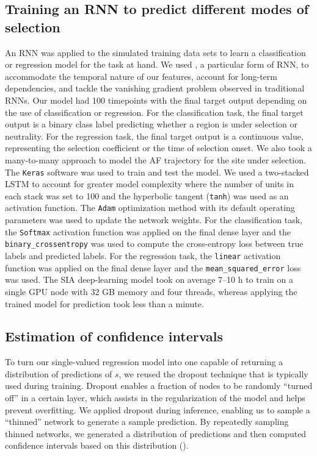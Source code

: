 \subsection{Training an \ac{RNN} to predict different modes of selection}
An \ac{RNN} was applied to the simulated training data sets to learn a classification or regression model for the task at hand. We used , a particular form of \ac{RNN}, to accommodate the temporal nature of our features, account for long-term dependencies, and tackle the vanishing gradient problem observed in traditional \acp{RNN}. Our model had 100 timepoints with the final target output depending on the use of classification or regression. For the classification task, the final target output is a binary class label predicting whether a region is under selection or neutrality. For the regression task, the final target output is a continuous value, representing the selection coefficient or the time of selection onset. We also took a many-to-many approach to model the \ac{AF} trajectory for the site under selection. The \texttt{Keras} software was used to train and test the model. We used a two-stacked \ac{LSTM} to account for greater model complexity where the number of units in each stack was set to 100 and the hyperbolic tangent (\texttt{tanh}) was used as an activation function. The \texttt{Adam} optimization method with its default operating parameters was used to update the network weights. For the classification task, the \texttt{Softmax} activation function was applied on the final dense layer and the \texttt{binary\_crossentropy} was used to compute the cross-entropy loss between true labels and predicted labels. For the regression task, the \texttt{linear} activation function was applied on the final dense layer and the \texttt{mean\_squared\_error} loss was used. The \ac{SIA} deep-learning model took on average 7–10 h to train on a single \acs{GPU} node with 32 GB memory and four threads, whereas applying the trained model for prediction took less than a minute.

\subsection{Estimation of confidence intervals}
To turn our single-valued regression model into one capable of returning a distribution of predictions of $s$, we reused the dropout technique that is typically used during training. Dropout enables a fraction of nodes to be randomly “turned off” in a certain layer, which assists in the regularization of the model and helps prevent overfitting. We applied dropout during inference, enabling us to sample a “thinned” network to generate a sample prediction. By repeatedly sampling thinned networks, we generated a distribution of predictions and then computed confidence intervals based on this distribution (\cite{gal_dropout_2016}).

